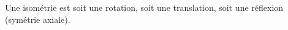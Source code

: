 Une isométrie est soit une rotation, soit une translation, soit une réflexion (symétrie axiale).

\begin{reponses}
\end{reponses}

